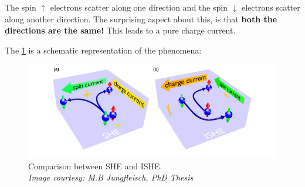 The spin $\uparrow$ electrons scatter along one direction and the spin $\downarrow$ electrons scatter along another direction. The surprising aspect about this, is that \textbf{both the directions are the same!}
This leads to a pure charge current.

The \cref{she-vs-ishe} is a schematic representation of the phenomena:

\begin{figure}[h!]
    \includegraphics[width=\columnwidth]{ishe.png}
    \caption{Comparison between SHE and ISHE.\\ \vspace{0.2cm}\textit{Image courtesy: M.B Jungfleisch, PhD Thesis}}
    \label{she-vs-ishe}
\end{figure}
